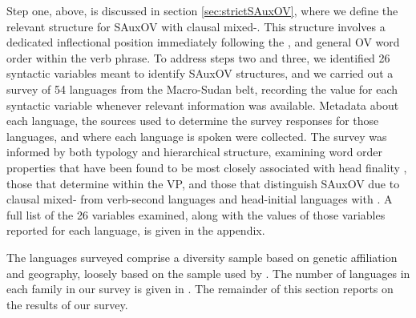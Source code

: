 \documentclass[output=paper]{LSP/langsci}
\begin{document}
Step one, above, is discussed in section \ref{sec:strictSAuxOV}, where we define the relevant structure for SAuxOV with clausal mixed-. This structure involves a dedicated inflectional position immediately following the , and general OV word order within the verb phrase. To address steps two and three, we identified 26 syntactic variables meant to identify SAuxOV structures, and we carried out a survey of 54 languages from the Macro-Sudan belt, recording the value for each syntactic variable whenever relevant information was available. Metadata about each language, the sources used to determine the survey responses for those languages, and where each language is spoken were collected. The survey was informed by both typology and hierarchical structure, examining word order properties that have been found to be most closely associated with head finality \citep{dryer92, dryer07}, those that determine  within the VP, and those that distinguish SAuxOV due to clausal mixed- from verb-second languages and head-initial languages with . A full list of the 26 variables examined, along with the values of those variables reported for each language, is given in the appendix.

The languages surveyed comprise a diversity sample based on genetic affiliation and geography, loosely based on the sample used by \citet{clements08}. The number of languages in each family in our survey is given in . The remainder of this section reports on the results of our survey.
\end{document}
